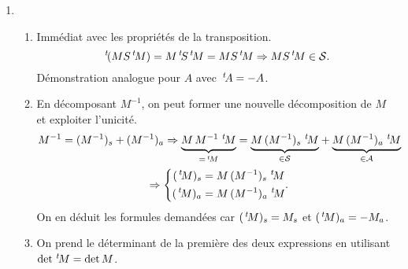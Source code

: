 \begin{enumerate}
 \item
\begin{enumerate}
 \item Immédiat avec les propriétés de la transposition.
\[
 \,\mathstrut^t\!{(M S \,\mathstrut^t\!{M})} = M \,\mathstrut^t\!{S} \,\mathstrut^t\!{M} = M S \,\mathstrut^t\!{M} \Rightarrow M S \,\mathstrut^t\!{M} \in \mathcal{S}.
\]
Démonstration analogue pour $A$ avec $\,\mathstrut^t\!{A} = -A$.

 \item En décomposant $M^{-1}$, on peut former une nouvelle décomposition de $M$ et exploiter l'unicité.
\begin{multline*}
 M^{-1} = (M^{-1})_s + (M^{-1})_a \Rightarrow
\underset{ = \trans{M}}{\underbrace{M\, M^{-1} \, \trans{M}}} = 
 \underset{\in \mathcal{S}}{\underbrace{M\, (M^{-1})_s \, \trans{M}}} 
+\underset{\in \mathcal{A}}{ \underbrace{M\, (M^{-1})_a \, \trans{M}}}\\
\Rightarrow
\left\lbrace 
\begin{aligned}
 (\trans{M})_s &= M\, (M^{-1})_s \, \trans{M} \\ (\trans{M})_a &= M\, (M^{-1})_a \, \trans{M}
\end{aligned}.
\right. \end{multline*}
On en déduit les formules demandées car $(\,\mathstrut^t\!{M})_s = M_s$ et $(\,\mathstrut^t\!{M})_a = -M_a$.

 \item On prend le déterminant de la première des deux expressions en utilisant $\det \,\mathstrut^t\!{M} = \det M$.
\end{enumerate}

\end{enumerate}


